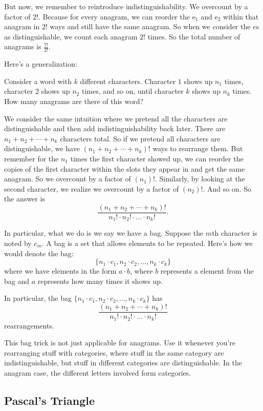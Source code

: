 \documentclass[11pt]{scrartcl}
\begin{document}
But now, we remember to reintroduce indistinguishability. We overcount by a factor of $2!$. Because for every anagram, we can reorder the $\text{e}_1$ and $\text{e}_2$ within that anagram in $2!$ ways and still have the same anagram. So when we consider the $e$s as distinguishable, we count each anagram $2!$ times. So the total number of anagrams is $\frac{7!}{2!}$.

Here's a generalization:
\begin{example}
Consider a word with $k$ different characters. Character $1$ shows up $n_1$ times, character 2 shows up $n_2$ times, and so on, until character $k$ shows up $n_k$ times. How many anagrams are there of this word?
\end{example}
We consider the same intuition where we pretend all the characters are distinguishable and then add indistinguishability back later. There are $n_1 + n_2 + \cdots + n_k$ characters total. So if we pretend all characters are distinguishable, we have $(n_1 + n_2 + \cdots + n_k)!$ ways to rearrange them. But remember for the $n_1$ times the first character showed up, we can reorder the copies of the first character within the slots they appear in and get the same anagram. So we overcount by a factor of $(n_1)!$. Similarly, by looking at the second character, we realize we overcount by a factor of $(n_2)!$. And so on. So the answer is \[\frac{(n_1 + n_2 + \cdots + n_k)!}{n_1! \cdot n_2! \cdot ... \cdot n_k!}.\]

In particular, what we do is we say we have a bag. Suppose the $m$th character is noted by $c_m$. A bag is a set that allows elements to be repeated. Here's how we would denote the bag: \[\{n_1 \cdot c_1, n_2 \cdot c_2, ..., n_k \cdot c_k\}\] where we have elements in the form $a \cdot b$, where $b$ represents a  element from the bag and $a$ represents how many times it shows up.

In particular, the bag $\{n_1 \cdot c_1, n_2 \cdot c_2, ..., n_k \cdot c_k\}$ has \[\frac{(n_1 + n_2 + \cdots + n_k)!}{n_1! \cdot n_2! \cdot ... \cdot n_k!}\] rearrangements. 

\begin{advice}
    This bag trick is not just applicable for anagrams. Use it whenever you're rearranging stuff with categories, where stuff in the same category are indistinguishable, but stuff in different categories are distinguishable. In the anagram case, the different letters involved form categories.
\end{advice}

\subsection{Pascal's Triangle}
\end{document}
